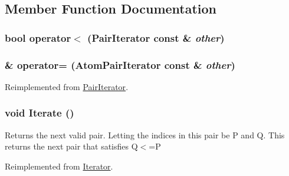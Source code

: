 \subsection{Member Function Documentation}
\hypertarget{classJKBuilder_1_1AtomPairIterator_a1984297ca1081efc0513ec2f5e6a6177}{
\subsubsection[{operator$<$}]{\setlength{\rightskip}{0pt plus 5cm}bool operator$<$ ({\bf PairIterator} const \& {\em other})}}
\label{classJKBuilder_1_1AtomPairIterator_a1984297ca1081efc0513ec2f5e6a6177}
\hypertarget{classJKBuilder_1_1AtomPairIterator_aefda578091b26523e72740cec884aa45}{
\subsubsection[{operator=}]{ \& operator= ({\bf AtomPairIterator} const \& {\em other})}}
\label{classJKBuilder_1_1AtomPairIterator_aefda578091b26523e72740cec884aa45}


Reimplemented from \hyperlink{classJKBuilder_1_1PairIterator_a698aa7b3d6495bd74dcff5b93be868a8}{PairIterator}.\hypertarget{classJKBuilder_1_1PairIterator_a7874a07e98b52f4f147cde6f39353bae}{
\subsubsection[{Iterate}]{\setlength{\rightskip}{0pt plus 5cm}void Iterate ()}}
\label{classJKBuilder_1_1PairIterator_a7874a07e98b52f4f147cde6f39353bae}


Returns the next valid pair. Letting the indices in this pair be P and Q. This returns the next pair that satisfies Q$<$=P 

Reimplemented from \hyperlink{classJKBuilder_1_1Iterator_a7874a07e98b52f4f147cde6f39353bae}{Iterator}.

